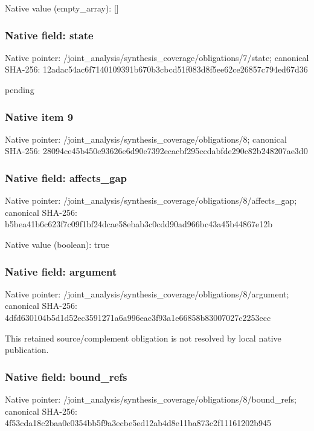 \documentclass[10pt,a4paper]{article}
\begin{document}
Native value (empty\_\allowbreak{}array): []

\subsubsection{Native field: state}
Native pointer: /joint\_\allowbreak{}analysis/synthesis\_\allowbreak{}coverage/obligations/7/state; canonical SHA-256: 12adac54ac6f7140109391b670b3cbcd51f083d8f5ee62ce26857c794ed67d36

\begingroup\raggedright\sloppy pending\par\endgroup

\subsubsection{Native item 9}
Native pointer: /joint\_\allowbreak{}analysis/synthesis\_\allowbreak{}coverage/obligations/8; canonical SHA-256: 28094ce45b450e93626e6d90e7392ecacbf295ccdabfde290c82b248207ae3d0

\subsubsection{Native field: affects\_\allowbreak{}gap}
Native pointer: /joint\_\allowbreak{}analysis/synthesis\_\allowbreak{}coverage/obligations/8/affects\_\allowbreak{}gap; canonical SHA-256: b5bea41b6c623f7c09f1bf24dcae58ebab3c0cdd90ad966bc43a45b44867e12b

Native value (boolean): true

\subsubsection{Native field: argument}
Native pointer: /joint\_\allowbreak{}analysis/synthesis\_\allowbreak{}coverage/obligations/8/argument; canonical SHA-256: 4dfd630104b5d1d52ec3591271a6a996eac3f93a1e66858b83007027c2253ecc

\begingroup\raggedright\sloppy This retained source/\allowbreak{}complement obligation is not resolved by local native publication.\par\endgroup

\subsubsection{Native field: bound\_\allowbreak{}refs}
Native pointer: /joint\_\allowbreak{}analysis/synthesis\_\allowbreak{}coverage/obligations/8/bound\_\allowbreak{}refs; canonical SHA-256: 4f53cda18c2baa0c0354bb5f9a3ecbe5ed12ab4d8e11ba873c2f11161202b945
\end{document}
